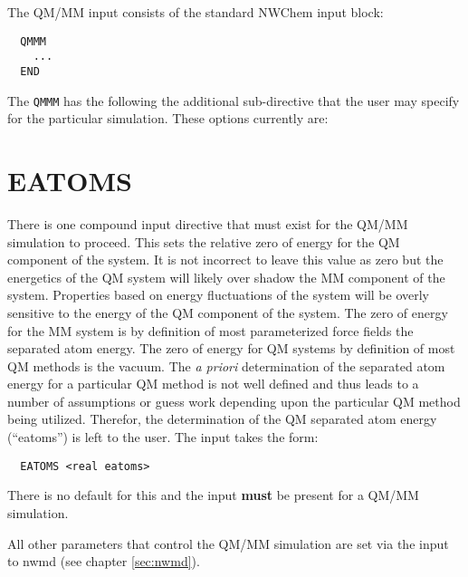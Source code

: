 The QM/MM input consists of the standard NWChem input block:
\begin{verbatim}
  QMMM
    ...
  END
\end{verbatim}

The \verb+QMMM+ has the following the additional sub-directive that the user
may specify for the particular simulation.  These options currently are:

\section{EATOMS}
There is one compound input directive that must exist for the QM/MM
simulation to proceed.  This sets the relative zero of energy for the
QM component of the system.  It is not incorrect to leave this value as
zero but the energetics of the QM system will likely over shadow the
MM component of the system.  Properties based on energy fluctuations
of the system will be overly sensitive to the energy of the QM
component of the system.  The zero of energy for the MM system is by
definition of most parameterized force fields the separated atom
energy.  The zero of energy for QM systems by definition of most QM
methods is the vacuum.  The {\it a priori} determination of the
separated atom energy for a particular QM method is not well defined
and thus leads to a number of assumptions or guess work depending upon
the particular QM method being utilized.  Therefor, the determination
of the QM separated atom energy (``eatoms'') is left to the user.  The
input takes the form:

\begin{verbatim}
  EATOMS <real eatoms>
\end{verbatim}

There is no default for this and the input {\bf must} be present for a
QM/MM simulation.  

All other parameters that control the QM/MM simulation are set via the
input to nwmd (see chapter \ref{sec:nwmd}).

